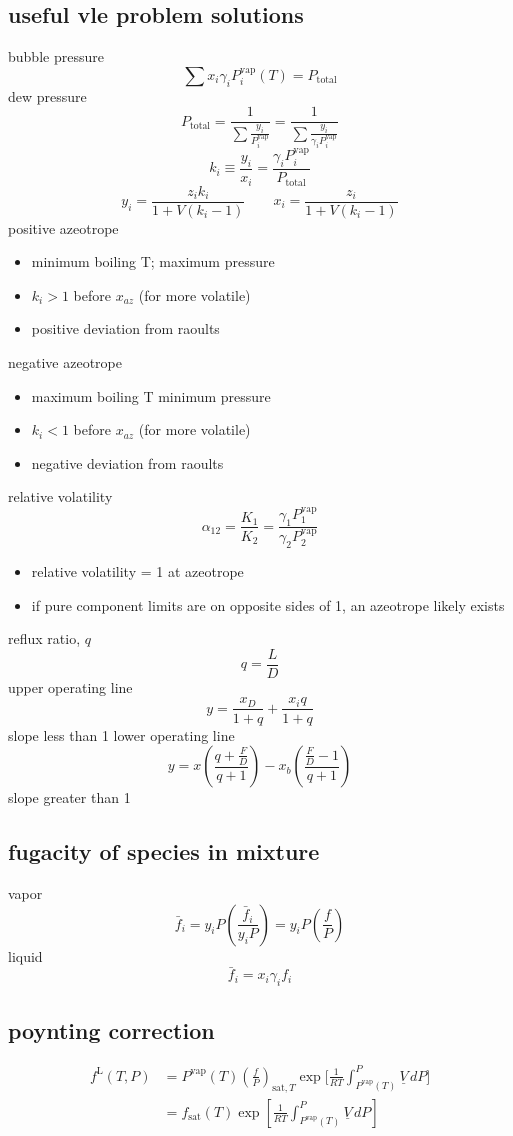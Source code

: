 \documentclass{article}
\begin{document}
\subsection*{useful vle problem solutions}
bubble pressure
\[\sum x_{i} \gamma_i P^{\text{vap}}_{i}(T) = P_{\text{total}}\]
dew pressure
\[P_{\text{total}} = \frac{1}{\displaystyle\sum \frac{y_{i}}{P^{\text{vap}}_{i}}} = \frac{1}{\displaystyle\sum \frac{y_{i}}{\gamma_i P^{\text{vap}}_{i}}}\]
\[k_i \equiv \frac{y_i}{x_i} = \frac{\gamma_i P^{\text{vap}}_{i} }{P_{\text{total}}} \] 
\[y_{i} = \frac{z_{i} k_{i} }{1 + V(k_{i} -1)} \hspace{2em} x_{i} = \frac{z_{i} }{1 + V(k_{i} -1)}\] 
positive azeotrope
\begin{itemize}
    \item minimum boiling T; maximum pressure
    \item $k_i>1$ before $x_{az}$ (for more volatile)
    \item positive deviation from raoults
\end{itemize}
negative azeotrope
\begin{itemize}
    \item maximum boiling T minimum pressure
    \item $k_i<1$ before $x_{az}$ (for more volatile)
    \item negative deviation from raoults
\end{itemize}
relative volatility
\[\alpha_{12} = \frac{K_1}{K_2} = \frac{\gamma_1 P^\mathrm{vap}_1}{\gamma_2 P^\mathrm{vap}_2}\]
\begin{itemize}
    \item relative volatility = 1 at azeotrope
    \item if pure component limits are on opposite sides of 1, an azeotrope likely exists
\end{itemize}
reflux ratio, $q$
\[q = \frac{L}{D}\]
upper operating line
\[y = \frac{x_{D}}{1+q} + \frac{x_{i}q}{1+q}\]
slope less than 1
lower operating line
\[y = x \left(\frac{ q+\frac{F}{D}}{q+1} \right) - x_{b} \left( \frac{\frac{F}{D} -1}{q+1} \right)\]
slope greater than 1
\subsection*{fugacity of species in mixture}
vapor
\[\bar{f}_{i} = y_{i} P \left( \frac{\bar{f}_{i}}{y_{i}P} \right) = y_i P \left(\frac{f}{P}\right) \]
liquid
\[\bar{f}_{i} = x_{i} \gamma_{i} f_{i}\]

\subsection*{poynting correction}
\begin{align*}
f^{\mathrm{L}}(T,P) &= P^{\mathrm{vap}}(T)
\left(\frac{f}{P}\right)_{\mathrm{sat},T} \exp\!\biggl[\frac{1}{RT}\int_{P^{\mathrm{vap}}(T)}^{P} \underline{V}\,dP\biggr] \\
&= f_{\mathrm{sat}}(T)\exp{\left[{\frac{1}{R T}}\int_{P^{\mathrm{vap}}(T)}^{P}\underline{V}\,d P\right]}
\end{align*}
\end{document}
